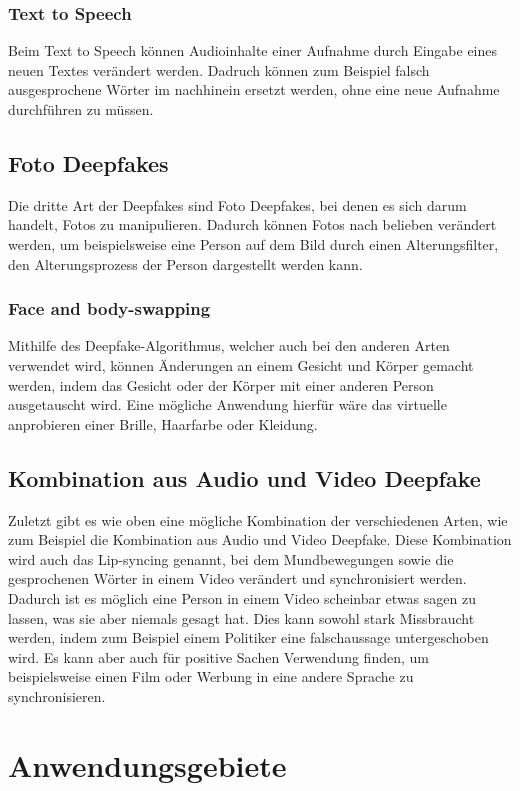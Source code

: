 \subsubsection{Text to Speech}
Beim Text to Speech können Audioinhalte einer Aufnahme durch Eingabe eines neuen Textes verändert werden. Dadruch können zum Beispiel falsch ausgesprochene Wörter im nachhinein ersetzt werden, ohne eine neue Aufnahme durchführen zu müssen.\cite{ResearchGate}

\subsection{Foto Deepfakes}
Die dritte Art der Deepfakes sind Foto Deepfakes, bei denen es sich darum handelt, Fotos zu manipulieren. Dadurch können Fotos nach belieben verändert werden, um beispielsweise eine Person auf dem Bild durch einen Alterungsfilter, den Alterungsprozess der Person dargestellt werden kann.\cite{ResearchGate}

\subsubsection{Face and body-swapping}
Mithilfe des Deepfake-Algorithmus, welcher auch bei den anderen Arten verwendet wird, können Änderungen an einem Gesicht und Körper gemacht werden, indem das Gesicht oder der Körper mit einer anderen Person ausgetauscht wird. Eine mögliche Anwendung hierfür wäre das virtuelle anprobieren einer Brille, Haarfarbe oder Kleidung.\cite{ResearchGate}

\subsection{Kombination aus Audio und Video Deepfake}
Zuletzt gibt es wie oben eine mögliche Kombination der verschiedenen Arten, wie zum Beispiel die Kombination aus Audio und Video Deepfake.
Diese Kombination wird auch das Lip-syncing genannt, bei dem Mundbewegungen sowie die gesprochenen Wörter in einem Video verändert und synchronisiert werden.
Dadurch ist es möglich eine Person in einem Video scheinbar etwas sagen zu lassen, was sie aber niemals gesagt hat. Dies kann sowohl stark Missbraucht werden, indem zum Beispiel einem Politiker eine falschaussage untergeschoben wird.
Es kann aber auch für positive Sachen Verwendung finden, um beispielsweise einen Film oder Werbung in eine andere Sprache zu synchronisieren.\cite{ResearchGate}

\section{Anwendungsgebiete}

